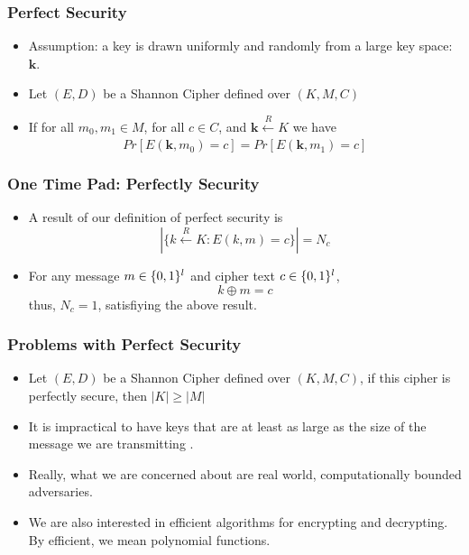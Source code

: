 \documentclass{beamer}
\begin{document}
\begin{frame}
\frametitle{Perfect Security}
\begin{itemize}
    \item Assumption: a key is drawn uniformly and randomly from a large key space: \(\textbf{k}\). \pause
    \item Let \((E, D)\) be a Shannon Cipher defined over \((K, M, C)\) \pause
    \item If for all \(m_0, m_1 \in M\), for all \(c \in C\), and \(\textbf{k} \xleftarrow[]{R} K\) we have \[Pr[E(\textbf{k}, m_0) = c] = Pr[E(\textbf{k}, m_1) = c] \]
\end{itemize}
\end{frame}

\begin{frame}
\frametitle{One Time Pad: Perfectly Security}
\begin{itemize}
    \item A result of our definition of perfect security is \[ | \{ k \xleftarrow[]{R} K: E(k, m) = c \} | = N_c \] \pause
    \item For any message \(m \in \{0, 1\}^{\mathnormal{l}}\) and cipher text \(c \in \{0, 1\}^{\mathnormal{l}}\), \[ k \oplus m = c \] \pause thus, \(N_c = 1\), satisfiying the above result.
\end{itemize}
\end{frame}

\begin{frame}
\frametitle{Problems with Perfect Security}
\begin{itemize}
    \item Let \((E, D)\) be a Shannon Cipher defined over \((K, M, C)\), if this cipher is perfectly secure, then \(|K| \geq |M|\) \pause
    \item It is impractical to have keys that are at least as large as the size of the message we are transmitting . \pause
    \item Really, what we are concerned about are real world, computationally bounded adversaries. \pause
    \item We are also interested in efficient algorithms for encrypting and decrypting. By efficient, we mean polynomial functions.
\end{itemize}
\end{frame}
\end{document}
